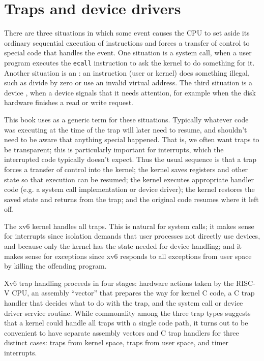 \chapter{Traps and device drivers}
\label{CH:TRAP}

There are three situations in which some event causes the CPU to set
aside its ordinary sequential execution of instructions and forces a
transfer of control to special code that handles the event. One
situation is a system call, when a user program 
executes the {\tt ecall} instruction to ask the kernel to do 
something for it. Another situation is an :
an instruction (user or kernel) does something illegal, such as divide
by zero or use an invalid virtual address. The third situation is a
device , when a device signals that it needs
attention, for example when the disk hardware finishes a read or write
request.

This book uses  as a generic term for these
situations. Typically whatever code was executing at the time of the
trap will later need to resume, and shouldn't need to be aware that
anything special happened. That is, we often want traps to be
transparent; this is particularly important for interrupts, which the
interrupted code typically doesn't expect. Thus the usual sequence is that
a trap forces a transfer of control into the kernel; the kernel saves
registers and other state so that execution can be resumed; the kernel
executes appropriate handler code (e.g. a system call implementation
or device driver); the kernel restores the saved state and returns
from the trap; and the original code resumes where it left off.

The xv6 kernel handles all traps. This is natural for system calls; it
makes sense for interrupts since isolation demands that user processes
not directly use devices, and because only the kernel has the state
needed for device handling; and it makes sense for exceptions since
xv6 responds to all exceptions from user space by killing the
offending program.

Xv6 trap handling proceeds in four stages: hardware actions taken by
the RISC-V CPU, an assembly ``vector'' that prepares the way for
kernel C code, a C trap handler that decides what to do with the trap,
and the system call or device driver service routine. While
commonality among the three trap types suggests that a kernel could
handle all traps with a single code path, it turns out to be
convenient to have separate assembly vectors and C trap handlers for
three distinct cases: traps from kernel space, traps from user space,
and timer interrupts.

